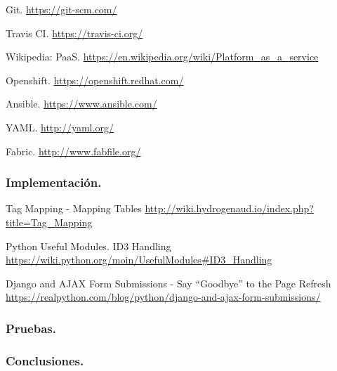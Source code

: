  Git. \url{https://git-scm.com/}

 Travis CI. \url{https://travis-ci.org/}

 Wikipedia: PaaS. \url{https://en.wikipedia.org/wiki/Platform_as_a_service}

 Openshift. \url{https://openshift.redhat.com/}

 Ansible. \url{https://www.ansible.com/}

 YAML. \url{http://yaml.org/}

 Fabric. \url{http://www.fabfile.org/}

\subsubsection*{Implementación.}

 Tag Mapping - Mapping Tables \url{http://wiki.hydrogenaud.io/index.php?title=Tag_Mapping}

 Python Useful Modules. ID3 Handling \url{https://wiki.python.org/moin/UsefulModules#ID3_Handling}

 Django and AJAX Form Submissions - Say ``Goodbye'' to the Page Refresh \url{https://realpython.com/blog/python/django-and-ajax-form-submissions/}

\subsubsection*{Pruebas.}

\subsubsection*{Conclusiones.}

